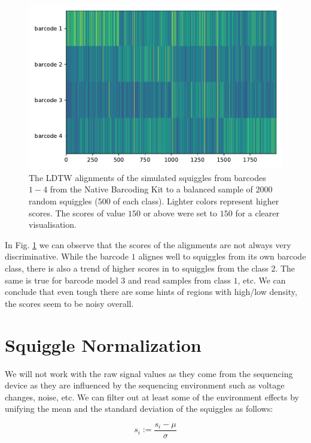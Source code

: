 \begin{figure}[!ht]
    \centering
    \includegraphics[scale=0.8]{images/align_to_means.pdf}
    \caption[LDTW alignments of mean barcodes to real squiggles]{The LDTW alignments of the simulated squiggles from barcodes $1-4$ from the Native Barcoding Kit to a balanced sample of $2000$ random squiggles ($500$ of each class). Lighter colors represent higher scores. The scores of value $150$ or above were set to $150$ for a clearer visualisation.}
    \label{fig:means_align}
\end{figure}

In Fig. \ref{fig:means_align} we can observe that the scores of the alignments are not always very discriminative. While the barcode $1$ alignes well to squiggles from its own barcode class, there is also a trend of higher scores in to squiggles from the class $2$. The same is true for barcode model $3$ and read samples from class $1$, etc. We can conclude that even tough there are some hints of regions with high/low density, the scores seem to be noisy overall.


\section{Squiggle Normalization}
We will not work with the raw signal values as they come from the sequencing device as they are influenced by the sequencing environment such as voltage changes, noise, etc. We can filter out at least some of the environment effects by unifying the mean and the standard deviation of the squiggles as follows:

\begin{equation}
s_i := \frac{s_i - \mu}{\sigma}
\end{equation}

